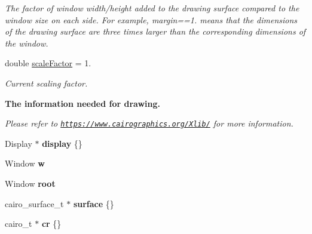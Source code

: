 \begin{DoxyCompactItemize}
\begin{DoxyCompactList}\small\item\em The factor of window width/height added to the drawing surface compared to the window size on each side. For example, margin==1. means that the dimensions of the drawing surface are three times larger than the corresponding dimensions of the window. \end{DoxyCompactList}\item 
double \hyperlink{structslb_1_1core_1_1ui_1_1Graphics_a5992d0a3c4f220c962a900e43e5abd8e}{scale\+Factor} = 1.\hypertarget{structslb_1_1core_1_1ui_1_1Graphics_a5992d0a3c4f220c962a900e43e5abd8e}{}\label{structslb_1_1core_1_1ui_1_1Graphics_a5992d0a3c4f220c962a900e43e5abd8e}

\begin{DoxyCompactList}\small\item\em Current scaling factor. \end{DoxyCompactList}\end{DoxyCompactItemize}
\begin{Indent}{\bf The information needed for drawing.}\par
{\em Please refer to \href{https://www.cairographics.org/Xlib/}{\tt https\+://www.\+cairographics.\+org/\+Xlib/} for more information. }\begin{DoxyCompactItemize}
\item 
Display $\ast$ {\bfseries display} \{\}\hypertarget{structslb_1_1core_1_1ui_1_1Graphics_aaee15e1382e9b404705f0b3095f01f25}{}\label{structslb_1_1core_1_1ui_1_1Graphics_aaee15e1382e9b404705f0b3095f01f25}

\item 
Window {\bfseries w}\hypertarget{structslb_1_1core_1_1ui_1_1Graphics_a0144f51c16d4fc2870602739c59a71da}{}\label{structslb_1_1core_1_1ui_1_1Graphics_a0144f51c16d4fc2870602739c59a71da}

\item 
Window {\bfseries root}\hypertarget{structslb_1_1core_1_1ui_1_1Graphics_a22def7a1a7f4f53c6899614d9673675f}{}\label{structslb_1_1core_1_1ui_1_1Graphics_a22def7a1a7f4f53c6899614d9673675f}

\item 
cairo\+\_\+surface\+\_\+t $\ast$ {\bfseries surface} \{\}\hypertarget{structslb_1_1core_1_1ui_1_1Graphics_a4ba46f3015dcfe2ecb869f8d297e69e2}{}\label{structslb_1_1core_1_1ui_1_1Graphics_a4ba46f3015dcfe2ecb869f8d297e69e2}

\item 
cairo\+\_\+t $\ast$ {\bfseries cr} \{\}\hypertarget{structslb_1_1core_1_1ui_1_1Graphics_adb908af9559c1c941aa26bba80786dcf}{}\label{structslb_1_1core_1_1ui_1_1Graphics_adb908af9559c1c941aa26bba80786dcf}

\end{DoxyCompactItemize}
\end{Indent}

